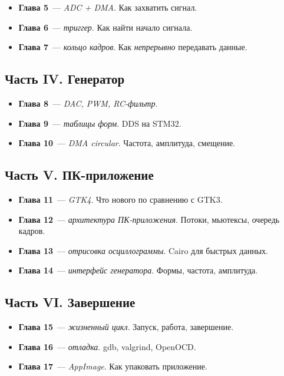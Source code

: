 \begin{itemize}
    \item \textbf{Глава 5}~--- \emph{ADC + DMA}. Как
          захватить сигнал.
    \item \textbf{Глава 6}~--- \emph{триггер}. Как найти
          начало сигнала.
    \item \textbf{Глава 7}~--- \emph{кольцо кадров}.
          Как \emph{непрерывно} передавать данные.
\end{itemize}

\subsection{Часть IV. Генератор}

\begin{itemize}
    \item \textbf{Глава 8}~--- \emph{DAC, PWM, RC-фильтр}.
    \item \textbf{Глава 9}~--- \emph{таблицы форм}.
          DDS на STM32.
    \item \textbf{Глава 10}~--- \emph{DMA circular}.
          Частота, амплитуда, смещение.
\end{itemize}

\subsection{Часть V. ПК-приложение}

\begin{itemize}
    \item \textbf{Глава 11}~--- \emph{GTK4}. Что нового
          по сравнению с GTK3.
    \item \textbf{Глава 12}~--- \emph{архитектура ПК-приложения}.
          Потоки, мьютексы, очередь кадров.
    \item \textbf{Глава 13}~--- \emph{отрисовка осциллограммы}.
          Cairo для быстрых данных.
    \item \textbf{Глава 14}~--- \emph{интерфейс генератора}.
          Формы, частота, амплитуда.
\end{itemize}

\subsection{Часть VI. Завершение}

\begin{itemize}
    \item \textbf{Глава 15}~--- \emph{жизненный цикл}.
          Запуск, работа, завершение.
    \item \textbf{Глава 16}~--- \emph{отладка}. gdb,
          valgrind, OpenOCD.
    \item \textbf{Глава 17}~--- \emph{AppImage}. Как
          упаковать приложение.
\end{itemize}

